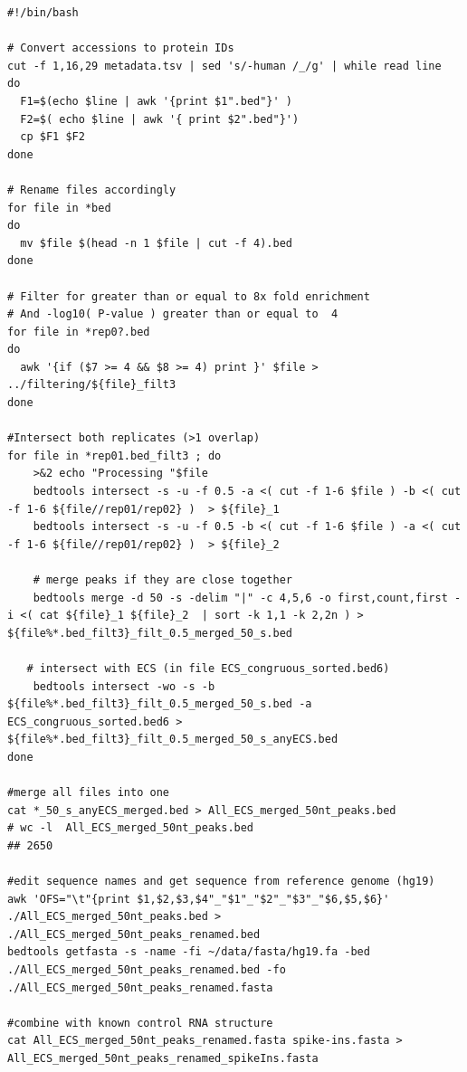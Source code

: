 \documentclass{bmcart}
\begin{document}
\begin{lstlisting}
#!/bin/bash

# Convert accessions to protein IDs
cut -f 1,16,29 metadata.tsv | sed 's/-human /_/g' | while read line 
do 
  F1=$(echo $line | awk '{print $1".bed"}' ) 
  F2=$( echo $line | awk '{ print $2".bed"}') 
  cp $F1 $F2 
done 

# Rename files accordingly
for file in *bed
do 
  mv $file $(head -n 1 $file | cut -f 4).bed
done

# Filter for greater than or equal to 8x fold enrichment
# And -log10( P-value ) greater than or equal to  4
for file in *rep0?.bed 
do
  awk '{if ($7 >= 4 && $8 >= 4) print }' $file > ../filtering/${file}_filt3
done

#Intersect both replicates (>1 overlap) 
for file in *rep01.bed_filt3 ; do     
    >&2 echo "Processing "$file
    bedtools intersect -s -u -f 0.5 -a <( cut -f 1-6 $file ) -b <( cut -f 1-6 ${file//rep01/rep02} )  > ${file}_1
    bedtools intersect -s -u -f 0.5 -b <( cut -f 1-6 $file ) -a <( cut -f 1-6 ${file//rep01/rep02} )  > ${file}_2
    
    # merge peaks if they are close together
    bedtools merge -d 50 -s -delim "|" -c 4,5,6 -o first,count,first -i <( cat ${file}_1 ${file}_2  | sort -k 1,1 -k 2,2n ) > ${file%*.bed_filt3}_filt_0.5_merged_50_s.bed
    
   # intersect with ECS (in file ECS_congruous_sorted.bed6) 
    bedtools intersect -wo -s -b ${file%*.bed_filt3}_filt_0.5_merged_50_s.bed -a ECS_congruous_sorted.bed6 > ${file%*.bed_filt3}_filt_0.5_merged_50_s_anyECS.bed
done

#merge all files into one
cat *_50_s_anyECS_merged.bed > All_ECS_merged_50nt_peaks.bed
# wc -l  All_ECS_merged_50nt_peaks.bed
## 2650

#edit sequence names and get sequence from reference genome (hg19) 
awk 'OFS="\t"{print $1,$2,$3,$4"_"$1"_"$2"_"$3"_"$6,$5,$6}'  ./All_ECS_merged_50nt_peaks.bed > ./All_ECS_merged_50nt_peaks_renamed.bed
bedtools getfasta -s -name -fi ~/data/fasta/hg19.fa -bed ./All_ECS_merged_50nt_peaks_renamed.bed -fo ./All_ECS_merged_50nt_peaks_renamed.fasta

#combine with known control RNA structure
cat All_ECS_merged_50nt_peaks_renamed.fasta spike-ins.fasta > All_ECS_merged_50nt_peaks_renamed_spikeIns.fasta
\end{lstlisting}
\end{document}
